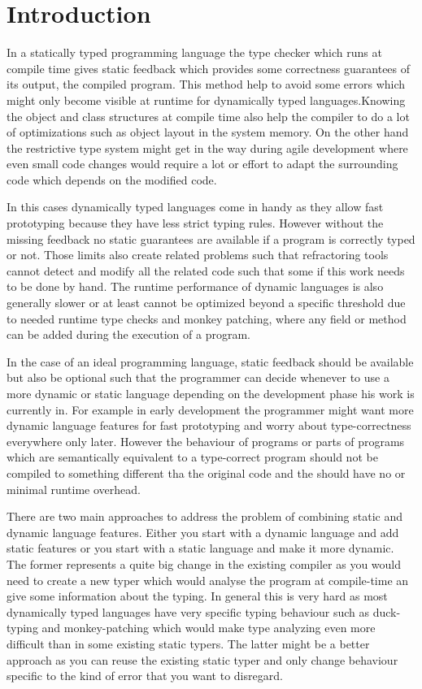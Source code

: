 \section{Introduction}

In a statically typed programming language the type checker which runs at
compile time gives static feedback which provides some correctness guarantees of
its output, the compiled program. This method help to avoid some errors which
might only become visible at runtime for dynamically typed languages.Knowing the
object and class structures at compile time also help the compiler to do a lot
of optimizations such as object layout in the system memory.
On the other hand the restrictive type system might get in the way during agile
development where even small code changes would require a lot or effort to adapt
the surrounding code which depends on the modified code.

In this cases dynamically typed languages come in handy as they allow fast
prototyping because they have less strict typing rules. However without the
missing feedback no static guarantees are available if a program is correctly
typed or not. Those limits also create related problems such that refractoring
tools cannot detect and modify all the related code such that some if this work
needs to be done by hand. The runtime performance of dynamic languages is also
generally slower or at least cannot be optimized beyond a specific threshold due
to needed runtime type checks and monkey patching, where any field or method can
be added during the execution of a program.

In the case of an ideal programming language, static feedback should be
available but also be optional such that the programmer can decide whenever to
use a more dynamic or static language depending on the development phase his
work is currently in. For example in early development the programmer might want
more dynamic language features for fast prototyping and worry about
type-correctness everywhere only later. However the behaviour of programs or
parts of programs which are semantically equivalent to a type-correct program
should not be compiled to something different tha the original code and the
should have no or minimal runtime overhead.

There are two main approaches to address the problem of combining static and
dynamic language features. Either you start with a dynamic language and add
static features or you start with a static language and make it more dynamic.
The former represents a quite big change in the existing compiler as you would
need to create a new typer which would analyse the program at compile-time an
give some information about the typing. In general this is very hard as most
dynamically typed languages have very specific typing behaviour such as
duck-typing and monkey-patching which would make type analyzing even more
difficult than in some existing static typers. The latter might be a better
approach as you can reuse the existing static typer and only change behaviour
specific to the kind of error that you want to disregard.



